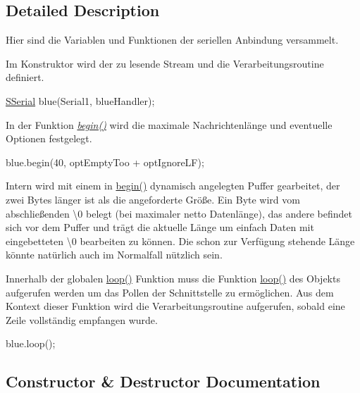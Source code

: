 \subsection{Detailed Description}
Hier sind die Variablen und Funktionen der seriellen Anbindung versammelt. \begin{DoxyVerb}Im Konstruktor wird der zu lesende Stream und die Verarbeitungsroutine definiert.
\end{DoxyVerb}

\begin{DoxyItemize}
\item \hyperlink{class_s_serial}{S\+Serial} blue(\+Serial1, blue\+Handler);

In der Funktion {\itshape \hyperlink{class_s_serial_ad82361ddb96f50e930af7734086c7ed8}{begin()}} wird die maximale Nachrichtenlänge und eventuelle Optionen festgelegt.
\end{DoxyItemize}

blue.\+begin(40, opt\+Empty\+Too + opt\+Ignore\+LF);

Intern wird mit einem in \hyperlink{class_s_serial_ad82361ddb96f50e930af7734086c7ed8}{begin()} dynamisch angelegten Puffer gearbeitet, der zwei Bytes länger ist als die angeforderte Größe. Ein Byte wird vom abschließenden \textquotesingle{}\textbackslash{}0\textquotesingle{} belegt (bei maximaler netto Datenlänge), das andere befindet sich vor dem Puffer und trägt die aktuelle Länge um einfach Daten mit eingebetteten \textquotesingle{}\textbackslash{}0\textquotesingle{} bearbeiten zu können. Die schon zur Verfügung stehende Länge könnte natürlich auch im Normalfall nützlich sein.

Innerhalb der globalen \hyperlink{class_s_serial_a4c07d6d5d036ca05717c73836c5cc807}{loop()} Funktion muss die Funktion \hyperlink{class_s_serial_a4c07d6d5d036ca05717c73836c5cc807}{loop()} des Objekts aufgerufen werden um das Pollen der Schnittstelle zu ermöglichen. Aus dem Kontext dieser Funktion wird die Verarbeitungsroutine aufgerufen, sobald eine Zeile vollständig empfangen wurde.
\begin{DoxyItemize}
\item blue.\+loop(); 
\end{DoxyItemize}

\subsection{Constructor \& Destructor Documentation}
\mbox{\label{class_s_serial_a44e2b09ee4e64e82df103166d21ac516}} 
